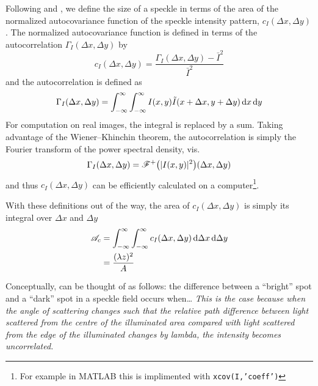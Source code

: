 
Following  and , we define the size of a
speckle in terms of the area of the normalized
autocovariance function of the speckle intensity pattern, $c_I(\Delta x,
\Delta y)$.  The normalized autocovariance function is defined in terms of
the autocorrelation $\Gamma_I(\Delta x, \Delta y)$ by 
\begin{equation}
c_I(\Delta x, \Delta y) = \frac{\Gamma_I(\Delta x, \Delta y) - \bar{I}^2}{\bar{I}^2}
\end{equation}
and the autocorrelation is defined as
\begin{equation}
\Gamma_I(\Delta x, \Delta y) = \int_{-\infty}^{\infty}\int_{-\infty}^{\infty} I(x,y) \tilde{I}(x+\Delta x,y+\Delta y) \,\mathrm{d} x \,\mathrm{d} y
\end{equation}
For computation on real images, the integral is replaced by a sum.  Taking
advantage of the Wiener–Khinchin theorem, the autocorrelation is simply the
Fourier transform of the power spectral density, vis.
\begin{equation}
\Gamma_I(\Delta x, \Delta y) = {\mathscr{F}^{+}\bigl(|I(x,y)|^2\bigr)}(\Delta x, \Delta y)
\end{equation}
and thus  $c_I(\Delta x, \Delta y)$ can be efficiently calculated on a
computer\footnote{For example in MATLAB this is implimented with
\texttt{xcov(I,'coeff')}}.

With these definitions out of the way, the area of $c_I(\Delta x, \Delta
y)$ is simply its integral over $\Delta x$ and $\Delta y$
\begin{align}
\mathscr{A}_c &= \int_{-\infty}^{\infty}\int_{-\infty}^{\infty} c_I(\Delta x, \Delta y) \,\mathrm{d} \Delta x \,\mathrm{d} \Delta y\\
&=\frac{(\lambda z)^2}{A}
\label{eqn:spotsize}
\end{align}

Conceptually,  can be thought of as follows: the
difference between a ``bright'' spot and a ``dark'' spot in a speckle field
occurs when\ldots
\textit{This is the case because when the angle of scattering changes such
that the relative path difference between light scattered from the centre
of the illuminated area compared with light scattered from the edge of the
illuminated changes by lambda, the intensity becomes uncorrelated.}

